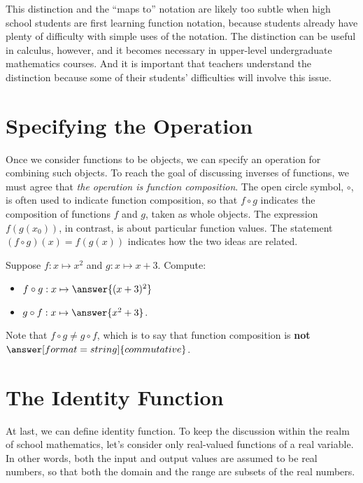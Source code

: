 \documentclass{ximera}
\begin{document}
This distinction and the ``maps to'' notation are likely too subtle when high school students are first learning function notation, because students already have plenty of difficulty with simple uses of the notation.  The distinction can be useful in calculus, however, and it becomes necessary in upper-level undergraduate mathematics courses.  And it is important that teachers understand the distinction because some of their students' difficulties will involve this issue.


\section*{Specifying the Operation}
Once we consider functions to be objects, we can specify an operation for combining such objects.  To reach the goal of discussing inverses of functions, we must agree that \emph{the operation is function composition}.  The open circle symbol, $\circ$, is often used to indicate function composition, so that $f\circ g$  indicates the composition of functions $f$ and $g$, taken as whole objects.  The expression $f(g(x_0))$, in contrast, is about particular function values.  The statement $(f\circ g)(x) = f(g(x))$ indicates how the two ideas are related.  

\begin{question}
Suppose $f: x\mapsto x^2$ and $g: x\mapsto x+3$.  Compute: 
\begin{itemize}
\item $f\circ g: x\mapsto \answer{(x+3)^2}$ 
\item $g\circ f: x\mapsto \answer{x^2+3}$. 
\end{itemize}

\begin{question}
Note that $f\circ g \neq g\circ f$, which is to say that function composition is \textbf{not} 
$\answer[format=string]{commutative}$.  
\end{question}
\end{question}

\section*{The Identity Function}
At last, we can define identity function.  To keep the discussion within the realm of school mathematics, let's consider only real-valued functions of a real variable.  In other words, both the input and output values are assumed to be real numbers, so that both the domain and the range are subsets of the real numbers.  
\end{document}
